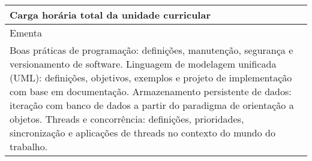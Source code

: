 \begin{quadro}[ht!]
\begin{tabular}{|p{3cm} p{2cm} p{3cm} p{2cm} p{3cm} p{2cm}|}
\multicolumn{5}{|p{13cm}|}{\cellcolor{blue1} Carga horária total da unidade curricular} & \multicolumn{1}{p{1cm}|}{\raggedleft 90	}\\\hline
\multicolumn{6}{|p{15cm}|}{\cellcolor{blue1} Ementa} \\\hline
\hline\multicolumn{6}{|p{15cm}|}{\scriptsize Boas práticas de programação: definições, manutenção, segurança e versionamento de software. Linguagem de modelagem unificada (UML): definições, objetivos, exemplos e projeto de implementação com base em documentação. Armazenamento persistente de dados: iteração com banco de dados a partir do paradigma de orientação a objetos. Threads e concorrência: definições, prioridades, sincronização e aplicações de threads no contexto do mundo do trabalho.}\\\hline
\hline
	\end{tabular}
\end{quadro}
